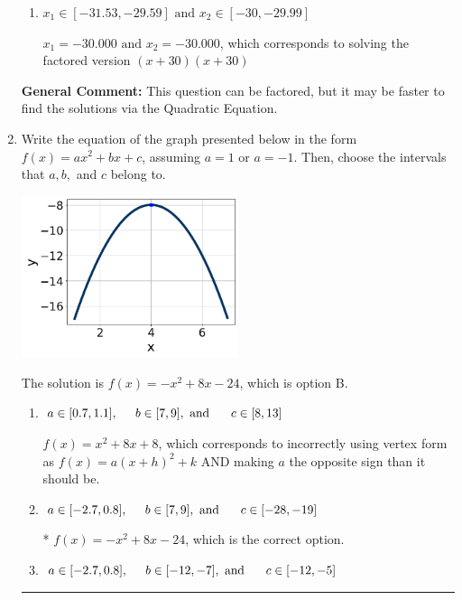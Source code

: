 \documentclass{extbook}[14pt]
\newcommand{\litem}[1]{\item #1

\rule{\textwidth}{0.4pt}}
\begin{document}
\begin{enumerate}
{\begin{enumerate}[label=\Alph*.]
* $x_1 = -1.200 \text{ and } x_2 = -1.200$, which is the correct option. Obtained by solving the factored version $(5x + 6)(5x + 6)$
\item \( x_1 \in [-31.53, -29.59] \text{ and } x_2 \in [-30, -29.99] \)

$x_1 = -30.000 \text{ and } x_2 = -30.000$, which corresponds to solving the factored version $(x + 30)(x + 30)$
\end{enumerate}

\textbf{General Comment:} This question can be factored, but it may be faster to find the solutions via the Quadratic Equation.
}
\litem{
Write the equation of the graph presented below in the form $f(x)=ax^2+bx+c$, assuming  $a=1$ or $a=-1$. Then, choose the intervals that $a, b,$ and $c$ belong to.

\begin{center}
    \includegraphics[width=0.5\textwidth]{../Figures/quadraticGraphToEquationCopyA.png}
\end{center}


The solution is \( f(x) = -x^{2} +8 x -24 \), which is option B.\begin{enumerate}[label=\Alph*.]
\item \( a \in [0.7, 1.1], \hspace*{5mm} b \in [7, 9], \text{ and } \hspace*{5mm} c \in [8, 13] \)

$f(x)=x^{2} +8 x + 8$, which corresponds to incorrectly using vertex form as $f(x) = a(x+h)^2+k$ AND making $a$ the opposite sign than it should be.
\item \( a \in [-2.7, 0.8], \hspace*{5mm} b \in [7, 9], \text{ and } \hspace*{5mm} c \in [-28, -19] \)

* $f(x)=-x^{2} +8 x -24$, which is the correct option.
\item \( a \in [-2.7, 0.8], \hspace*{5mm} b \in [-12, -7], \text{ and } \hspace*{5mm} c \in [-12, -5] \)


\end{enumerate}}
\end{enumerate}
\end{document}
